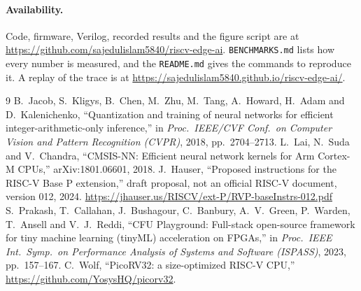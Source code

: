 \documentclass[10pt,a4paper]{article}
\begin{document}
\paragraph{Availability.} Code, firmware, Verilog, recorded results and the figure script are at \url{https://github.com/sajedulislam5840/riscv-edge-ai}. \texttt{BENCHMARKS.md} lists how every number is measured, and the \texttt{README.md} gives the commands to reproduce it. A replay of the trace is at \url{https://sajedulislam5840.github.io/riscv-edge-ai/}.

\begin{thebibliography}{9}\small
{} B.~Jacob, S.~Kligys, B.~Chen, M.~Zhu, M.~Tang, A.~Howard, H.~Adam and D.~Kalenichenko, ``Quantization and training of neural networks for efficient integer-arithmetic-only inference,'' in \emph{Proc.\ IEEE/CVF Conf.\ on Computer Vision and Pattern Recognition (CVPR)}, 2018, pp.~2704--2713.
 L.~Lai, N.~Suda and V.~Chandra, ``CMSIS-NN: Efficient neural network kernels for Arm Cortex-M CPUs,'' arXiv:1801.06601, 2018.
 J.~Hauser, ``Proposed instructions for the RISC-V Base P extension,'' draft proposal, not an official RISC-V document, version 012, 2024. \url{https://jhauser.us/RISCV/ext-P/RVP-baseInstrs-012.pdf}
 S.~Prakash, T.~Callahan, J.~Bushagour, C.~Banbury, A.~V.~Green, P.~Warden, T.~Ansell and V.~J.~Reddi, ``CFU Playground: Full-stack open-source framework for tiny machine learning (tinyML) acceleration on FPGAs,'' in \emph{Proc.\ IEEE Int.\ Symp.\ on Performance Analysis of Systems and Software (ISPASS)}, 2023, pp.~157--167.
 C.~Wolf, ``PicoRV32: a size-optimized RISC-V CPU,'' \url{https://github.com/YosysHQ/picorv32}.
\end{thebibliography}
\end{document}

